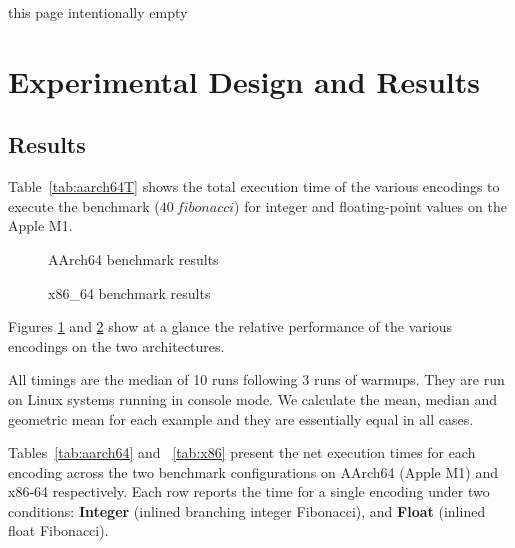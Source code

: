 \documentclass[manuscript,screen,review,sigplan]{acmart}
\newcommand{\code}[1]{\colorbox{gray!10}{\texttt{$#1$}}}
\begin{document}
this page intentionally empty
\newpage
\section{Experimental Design and Results}\label{results}
\subsection{Results}
\iftrue
Table~\ref{tab:aarch64T} shows the total execution time of the various encodings to execute the benchmark  (\code{40~fibonacci}) for integer and floating-point values on the Apple M1.

\begin{table}[htbp]
    \centering
    \aarchTotal
    \caption{AArch64 (Apple M1) total timing for encodings}
    \label{tab:aarch64T}
\end{table}

\begin{figure}[htbp]
    \centering
    \aarchBarChart
    \caption{AArch64 benchmark results}
    \label{fig:aarch64}
\end{figure}
\begin{figure}[htbp]
    \centering
    \xBarChart
    \caption{x86\_64 benchmark results}
    \label{fig:x86}
\end{figure}

Figures \ref{fig:aarch64} and \ref{fig:x86} show at a glance the relative performance of the various encodings on the two architectures.

  All timings are the median of 10 runs following 3 runs of warmups.
They are run on Linux systems running in console mode.
We calculate the mean, median and geometric mean for each example and they are essentially equal in all cases.

\begin{table}[htbp]
      \centering
      \begin{minipage}{0.48\textwidth}
          \centering
          \aarchSummary
          \caption{AArch64 (Apple M1) net timing for encodings}
          \label{tab:aarch64}
      \end{minipage}
      \hfill
      \begin{minipage}{0.48\textwidth}
          \centering
          \xSummary
          \caption{x86-64 (Linux) net timing for encodings}
          \label{tab:x86}
      \end{minipage}
\end{table}

Tables~\ref{tab:aarch64} and ~\ref{tab:x86} present the net execution times for each encoding across the two benchmark configurations on AArch64 (Apple M1) and x86-64 respectively. Each row reports the time for a single encoding under two conditions: \textbf{Integer} (inlined branching integer Fibonacci), and \textbf{Float} (inlined float Fibonacci).
\fi
\end{document}
